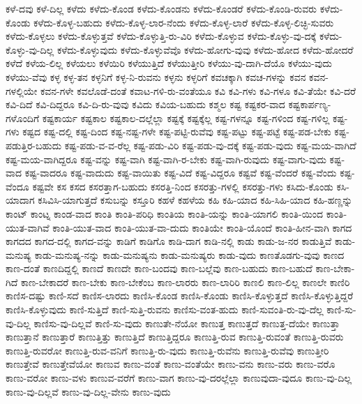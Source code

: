 {ಕಳೆ-ದವು
ಕಳೆ-ದಿಲ್ಲ
ಕಳೆದು
ಕಳೆದು-ಕೊಂಡ
ಕಳೆದು-ಕೊಂಡನು
ಕಳೆದು-ಕೊಂಡರೆ
ಕಳೆದು-ಕೊಂಡಿ-ರುವರು
ಕಳೆದು-ಕೊಂಡು
ಕಳೆದು-ಕೊಳ್ಳ-ಬಹುದು
ಕಳೆದು-ಕೊಳ್ಳ-ಲಾರ-ನೆಂದು
ಕಳೆದು-ಕೊಳ್ಳ-ಲಾರೆ
ಕಳೆದು-ಕೊಳ್ಳ-ಲಿಚ್ಛಿ-ಸುವರು
ಕಳೆದು-ಕೊಳ್ಳಲು
ಕಳೆದು-ಕೊಳ್ಳುತ್ತವೆ
ಕಳೆದು-ಕೊಳ್ಳುತ್ತಿ-ರು-ವಿರಿ
ಕಳೆದು-ಕೊಳ್ಳುವ
ಕಳೆದು-ಕೊಳ್ಳು-ವು-ದಕ್ಕೆ
ಕಳೆದು-ಕೊಳ್ಳು-ವು-ದಿಲ್ಲ
ಕಳೆದು-ಕೊಳ್ಳುವುದು
ಕಳೆದು-ಕೊಳ್ಳುವೆವೊ
ಕಳೆದು-ಹೋಗು-ವುವು
ಕಳೆದು-ಹೋದ
ಕಳೆದು-ಹೋದರೆ
ಕಳೆದೆ
ಕಳೆಯ-ಲಿಲ್ಲ
ಕಳೆಯಲು
ಕಳೆಯಿರಿ
ಕಳೆಯುತ್ತಿದೆ
ಕಳೆಯುತ್ತೀರಿ
ಕಳೆಯು-ವು-ದಾಗಿ-ದೆಯೊ
ಕಳೆಯು-ವುದು
ಕಳೆಯು-ವೆವು
ಕಳ್ಳ
ಕಳ್ಳ-ತನ
ಕಳ್ಳನಿಗೆ
ಕಳ್ಳ-ನಿ-ರುವನು
ಕಳ್ಳನು
ಕಳ್ಳರಿಗೆ
ಕವಚಕ್ಕಾಗಿ
ಕವಚ-ಗಳನ್ನು
ಕವನ
ಕವನ-ಗಳಲ್ಲಿಯೇ
ಕವನ-ಗಳೇ
ಕವಲೊಡೆ-ದಂತೆ
ಕವಾಟ-ಗಳಿ-ರು-ವಂತೆಯೂ
ಕವಿ
ಕವಿ-ಗಳು
ಕವಿ-ಗಳೂ
ಕವಿ-ತೆಯೇ
ಕವಿ-ದರೆ
ಕವಿ-ದಿದೆ
ಕವಿ-ದಿದ್ದರೂ
ಕವಿ-ದಿ-ರು-ವುವು
ಕವಿದು
ಕವಿಯ-ಬಹುದು
ಕಶ್ಮಲ
ಕಷ್ಟ
ಕಷ್ಟಕರ-ವಾದ
ಕಷ್ಟಕಾರ್ಪಣ್ಯ-ಗಳೊಂದಿಗೆ
ಕಷ್ಟಕಾರ್ಯ
ಕಷ್ಟಕಾಲ
ಕಷ್ಟಕಾಲ-ದಲ್ಲೆಲ್ಲಾ
ಕಷ್ಟಕ್ಕೆ
ಕಷ್ಟಕ್ಕೆಲ್ಲ
ಕಷ್ಟ-ಗಳನ್ನೂ
ಕಷ್ಟ-ಗಳಿಂದ
ಕಷ್ಟ-ಗಳಿಲ್ಲ
ಕಷ್ಟ-ಗಳು
ಕಷ್ಟದ
ಕಷ್ಟ-ದಲ್ಲಿ
ಕಷ್ಟ-ದಿಂದ
ಕಷ್ಟ-ನಷ್ಟ-ಗಳೇ
ಕಷ್ಟ-ಪಟ್ಟಿ-ರುವೆವು
ಕಷ್ಟ-ಪಟ್ಟು
ಕಷ್ಟ-ಪಟ್ಟೆ
ಕಷ್ಟ-ಪಡ-ಬೇಕು
ಕಷ್ಟ-ಪಡುತ್ತಿರ-ಬಹುದು
ಕಷ್ಟ-ಪಡು-ವ-ವ-ರೆಲ್ಲ
ಕಷ್ಟ-ಪಡು-ವಿರಿ
ಕಷ್ಟ-ಪಡು-ವು-ದಕ್ಕೆ
ಕಷ್ಟ-ಪಡು-ವುದು
ಕಷ್ಟ-ಮಯ-ವಾಗಿದೆ
ಕಷ್ಟ-ಮಯ-ವಾಗಿದ್ದರೂ
ಕಷ್ಟ-ವನ್ನು
ಕಷ್ಟ-ವಾಗಿ
ಕಷ್ಟ-ವಾಗಿ-ರ-ಬೇಕು
ಕಷ್ಟ-ವಾಗಿ-ರುವುದು
ಕಷ್ಟ-ವಾಗು-ವುದು
ಕಷ್ಟ-ವಾದ
ಕಷ್ಟ-ವಾದರೂ
ಕಷ್ಟ-ವಾದುದು
ಕಷ್ಟ-ವಾಯಿತು
ಕಷ್ಟ-ವಿದೆ
ಕಷ್ಟ-ವಿದ್ದರೂ
ಕಷ್ಟವೆ
ಕಷ್ಟ-ವೆಂದರೆ
ಕಷ್ಟ-ವೆಂದು
ಕಷ್ಟ-ವೆಂದೂ
ಕಷ್ಟವೇ
ಕಸ
ಕಸದ
ಕಸರತ್ತಾಗ-ಬಹುದು
ಕಸರತ್ತಿ-ನಿಂದ
ಕಸರತ್ತು-ಗಳಲ್ಲಿ
ಕಸರತ್ತು-ಗಳು
ಕಸಿದು-ಕೊಂಡು
ಕಸಿ-ಯಾದಾಗ
ಕಸಿವಿಸಿ-ಯಾಗುತ್ತದೆ
ಕಸುಬನ್ನು
ಕಸ್ತೂರಿ
ಕಹಳೆ
ಕಹಳೆಯ
ಕಹಿ
ಕಹಿ-ಯಾದ
ಕಹಿ-ಸಿಹಿ-ಯಾದ
ಕಹಿ-ಹಣ್ಣನ್ನು
ಕಾಂಟ್
ಕಾಂಟ್ನ
ಕಾಂಡ-ವಾದ
ಕಾಂತಿ
ಕಾಂತಿ-ಪರಿಧಿ
ಕಾಂತಿಯ
ಕಾಂತಿ-ಯನ್ನು
ಕಾಂತಿ-ಯಾಗಲಿ
ಕಾಂತಿ-ಯಿಂದ
ಕಾಂತಿ-ಯುತ-ವಾಗಿವೆ
ಕಾಂತಿ-ಯುತ-ವಾದ
ಕಾಂತಿ-ಯುತ-ವಾ-ದುದು
ಕಾಂತಿಯೇ
ಕಾಂತಿ-ಯೊಂದೆ
ಕಾಂತಿ-ಹೀನ-ವಾಗಿ
ಕಾಗದ
ಕಾಗದದ
ಕಾಗದ-ದಲ್ಲಿ
ಕಾಗದ-ವನ್ನು
ಕಾಡಿಗೆ
ಕಾಡಿಗೊ
ಕಾಡಿ-ದಾಗ
ಕಾಡಿ-ನಲ್ಲಿ
ಕಾಡು
ಕಾಡು-ಜ-ನರ
ಕಾಡುತ್ತಿವೆ
ಕಾಡು-ಮನುಷ್ಯ
ಕಾಡು-ಮನುಷ್ಯ-ನನ್ನು
ಕಾಡು-ಮನುಷ್ಯನು
ಕಾಡು-ಮನುಷ್ಯರು
ಕಾಡು-ವುದು
ಕಾಣತೊಡಗು-ವುವು
ಕಾಣದ
ಕಾಣ-ದಂತೆ
ಕಾಣದಿದ್ದಲ್ಲಿ
ಕಾಣದೆ
ಕಾಣದೇ
ಕಾಣ-ಬಂದವು
ಕಾಣ-ಬಲ್ಲೆವು
ಕಾಣ-ಬಹುದು
ಕಾಣ-ಬಹುದೆ
ಕಾಣ-ಬೇಕಾ-ಗಿದೆ
ಕಾಣ-ಬೇಕಾದರೆ
ಕಾಣ-ಬೇಕು
ಕಾಣ-ಬೇಕೆಂಬ
ಕಾಣ-ಲಾರರು
ಕಾಣ-ಲಾರಿರಿ
ಕಾಣಲಿ
ಕಾಣ-ಲಿಲ್ಲ
ಕಾಣಲೇ
ಕಾಣಿರಿ
ಕಾಣಿಸ-ದಷ್ಟು
ಕಾಣಿ-ಸದೆ
ಕಾಣಿಸ-ಲಾರದು
ಕಾಣಿಸಿ-ಕೊಂಡ
ಕಾಣಿಸಿ-ಕೊಂಡು
ಕಾಣಿಸಿ-ಕೊಳ್ಳುತ್ತದೆ
ಕಾಣಿಸಿ-ಕೊಳ್ಳುತ್ತಿದ್ದರೆ
ಕಾಣಿಸಿ-ಕೊಳ್ಳುವುದು
ಕಾಣಿ-ಸುತ್ತಿದೆ
ಕಾಣಿ-ಸುತ್ತಿ-ರುವನು
ಕಾಣಿಸು-ವಂತ-ಹುದು
ಕಾಣಿ-ಸುವಂತಿ-ರು-ವು-ದೆಲ್ಲ
ಕಾಣಿ-ಸು-ವು-ದಿಲ್ಲ
ಕಾಣಿಸು-ವು-ದಿಲ್ಲವೆ
ಕಾಣಿ-ಸು-ವುದು
ಕಾಣುತೇ-ನೆಯೋ
ಕಾಣುತ್ತ
ಕಾಣುತ್ತದೆ
ಕಾಣುತ್ತ-ದೆಯೇ
ಕಾಣುತ್ತಾ
ಕಾಣುತ್ತಾನೆ
ಕಾಣುತ್ತಾರೆ
ಕಾಣುತ್ತಿತ್ತು
ಕಾಣುತ್ತಿದೆ
ಕಾಣುತ್ತಿದ್ದರೂ
ಕಾಣುತ್ತಿ-ರುವ
ಕಾಣುತ್ತಿ-ರುವಂತೆ
ಕಾಣುತ್ತಿ-ರುವರು
ಕಾಣುತ್ತಿ-ರುವರೋ
ಕಾಣುತ್ತಿ-ರುವ-ವನಿಗೆ
ಕಾಣುತ್ತಿ-ರು-ವುದು
ಕಾಣುತ್ತಿ-ರುವೆನು
ಕಾಣುತ್ತಿ-ರುವೆವು
ಕಾಣುತ್ತೀರಿ
ಕಾಣುತ್ತೇವೆ
ಕಾಣುತ್ತೇವೆಯೋ
ಕಾಣುವ
ಕಾಣು-ವಂತೆ
ಕಾಣು-ವಂತೆಯೇ
ಕಾಣು-ವನು
ಕಾಣು-ವರು
ಕಾಣು-ವರೊ
ಕಾಣು-ವರೋ
ಕಾಣು-ವಳು
ಕಾಣುವ-ವರೆಗೆ
ಕಾಣು-ವಾಗ
ಕಾಣು-ವು-ದರಲ್ಲೆಲ್ಲಾ
ಕಾಣುವುದಾ-ವುದೂ
ಕಾಣು-ವು-ದಿಲ್ಲ
ಕಾಣು-ವು-ದಿಲ್ಲವೆ
ಕಾಣು-ವು-ದಿಲ್ಲ-ವೇನು
ಕಾಣು-ವುದು
}
